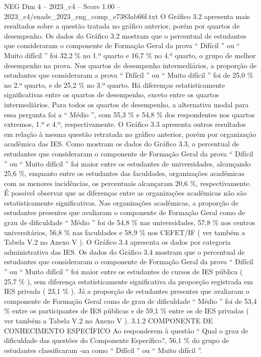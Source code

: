 \begin{textsample}{NEG Dim 4 – 2023\_c4 – Score 1.00 – 2023\_c4/enade\_2023\_eng\_comp\_e7383ab66f.txt}
O Gráfico 3.2 apresenta mais resultados sobre a questão tratada no gráfico anterior, porém por quartos de desempenho.
Os dados do Gráfico 3.2 mostram que o percentual de estudantes que consideraram o componente de Formação Geral da prova “ Difícil ” ou “ Muito difícil ” foi 32,2 \% no 1.º quarto e 16,7 \% no 4.º quarto, o grupo de melhor desempenho na prova.
Nos quartos de desempenho intermediários, a proporção de estudantes que consideraram a prova “ Difícil ” ou “ Muito difícil ” foi de 25,0 \% no 2.º quarto, e de 25,2 \% no 3.º quarto.
Há diferenças estatisticamente significativas entre os quartos de desempenho, exceto entre os quartos intermediários.
Para todos os quartos de desempenho, a alternativa modal para essa pergunta foi a “ Médio ”, com 55,3 \% e 54,8 \% dos respondentes nos quartos extremos, 1.º e 4.º, respectivamente.
O Gráfico 3.3 apresenta outros resultados em relação à mesma questão retratada no gráfico anterior, porém por organização acadêmica das IES.
Como mostram os dados do Gráfico 3.3, o percentual de estudantes que consideraram o componente de Formação Geral da prova “ Difícil ” ou “ Muito difícil ” foi maior entre os estudantes de universidades, alcançando 25,6 \%, enquanto entre os estudantes das faculdades, organizações acadêmicas com as menores incidências, os percentuais alcançaram 20,6 \%, respectivamente.
É possível observar que as diferenças entre as organizações acadêmicas não são estatisticamente significativas.
Nas organizações acadêmicas, a proporção de estudantes presentes que avaliaram o componente de Formação Geral como de grau de dificuldade “ Médio ” foi de 54,8 \% nas universidades, 57,8 \% nos centros universitários, 56,8 \% nas faculdades e 58,9 \% nos CEFET/IF ( ver também a Tabela V.2 no Anexo V ).
O Gráfico 3.4 apresenta os dados por categoria administrativa das IES.
Os dados do Gráfico 3.4 mostram que o percentual de estudantes que consideraram o componente de Formação Geral da prova “ Difícil ” ou “ Muito difícil ” foi maior entre os estudantes de cursos de IES pública ( 25,7 \% ), sem diferença estatisticamente significativa da proporção registrada em IES privada ( 23,1 \% ).
Já a proporção de estudantes presentes que avaliaram o componente de Formação Geral como de grau de dificuldade “ Médio ” foi de 53,4 \% entre os participantes de IES públicas e de 59,1 \% entre os de IES privadas ( ver também a Tabela V.2 no Anexo V ). 3.1.2 COMPONENTE DE CONHECIMENTO ESPECÍFICO Ao responderem à questão “ Qual o grau de dificuldade das questões do Componente Específico?, 56,1 \% do grupo de estudantes classificaram -na como “ Difícil ” ou “ Muito difícil ”.

\end{textsample}
